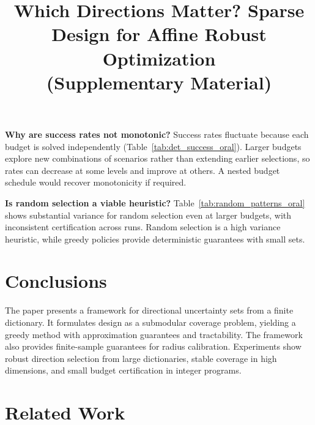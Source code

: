 \documentclass[accepted]{uai2026}
\theoremstyle{plain}
\theoremstyle{definition}
\theoremstyle{remark}
\begin{document}
\noindent\textbf{Why are success rates not monotonic?}
Success rates fluctuate because each budget is solved independently (Table~\ref{tab:det_success_oral}). Larger budgets explore new combinations of scenarios rather than extending earlier selections, so rates can decrease at some levels and improve at others. A nested budget schedule would recover monotonicity if required.

\noindent\textbf{Is random selection a viable heuristic?}
Table~\ref{tab:random_patterns_oral} shows substantial variance for random selection even at larger budgets, with inconsistent certification across runs. Random selection is a high variance heuristic, while greedy policies provide deterministic guarantees with small sets.



\section{Conclusions}
\label{sec:conclusion}

The paper presents a framework for directional uncertainty sets from a finite dictionary. It formulates design as a submodular coverage problem, yielding a greedy method with approximation guarantees and tractability. The framework also provides finite-sample guarantees for radius calibration. Experiments show robust direction selection from large dictionaries, stable coverage in high dimensions, and small budget certification in integer programs.
% 






\clearpage
\appendix
\newpage
\appendix
\onecolumn
\title{Which Directions Matter? Sparse Design for Affine Robust Optimization\\(Supplementary Material)}
\maketitle

\section{Related Work}
\end{document}
